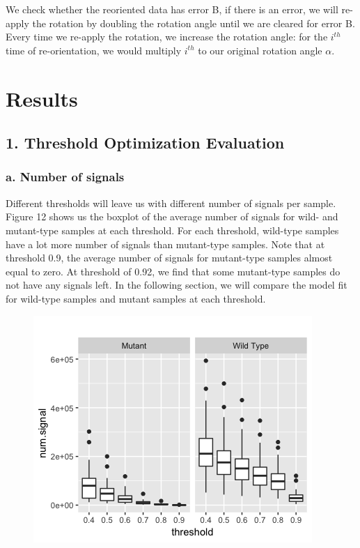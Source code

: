\documentclass[10pt,letterpaper]{article}
\begin{document}
We check whether the reoriented data has error B, if there is an error,
we will re-apply the rotation by doubling the rotation angle until we
are cleared for error B. Every time we re-apply the rotation, we
increase the rotation angle: for the \(i^{th}\) time of re-orientation,
we would multiply \(i^{th}\) to our original rotation angle \(\alpha\).

\hypertarget{results}{%
\section{Results}\label{results}}

\hypertarget{threshold-optimization-evaluation}{%
\subsection{1. Threshold Optimization
Evaluation}\label{threshold-optimization-evaluation}}

\hypertarget{a.-number-of-signals}{%
\subsubsection{a. Number of signals}\label{a.-number-of-signals}}

Different thresholds will leave us with different number of signals per
sample. Figure 12 shows us the boxplot of the average number of signals
for wild- and mutant-type samples at each threshold. For each threshold,
wild-type samples have a lot more number of signals than mutant-type
samples. Note that at threshold 0.9, the average number of signals for
mutant-type samples almost equal to zero. At threshold of 0.92, we find
that some mutant-type samples do not have any signals left. In the
following section, we will compare the model fit for wild-type samples
and mutant samples at each threshold.

\begin{figure}[H]
\includegraphics[width=0.6\linewidth]{visualization_paper/thresh_numsig_boxplot} \end{figure}
\end{document}
